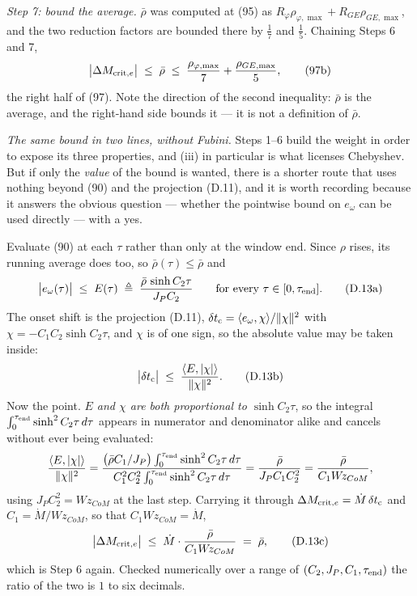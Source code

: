 \documentclass[11pt]{article}
\newcommand{\Wz}{W\!z_{CoM}}
\newcommand{\te}{\tau_{\rm end}}
\newcommand{\rbar}{\bar\rho}
\begin{document}
\emph{Step 7: bound the average.} $\rbar$ was computed at (95) as
$R_\varphi\rho_{\varphi,\max} + R_{GE}\rho_{GE,\max}$, and the two
reduction factors are bounded there by $\tfrac17$ and $\tfrac15$.
Chaining Steps 6 and 7,
\begin{equation}
  \bigl|\Delta M_{{\rm crit},e}\bigr| \;\le\; \rbar
  \;\le\; \frac{\rho_{\varphi,\max}}{7} + \frac{\rho_{GE,\max}}{5},
  \tag{97b}
\end{equation}
the right half of (97). Note the direction of the second inequality:
$\rbar$ is the average, and the right-hand side bounds it --- it is not
a definition of $\rbar$.

\emph{The same bound in two lines, without Fubini.} Steps 1--6 build the
weight in order to expose its three properties, and (iii) in particular
is what licenses Chebyshev. But if only the \emph{value} of the bound is
wanted, there is a shorter route that uses nothing beyond (90) and the
projection (D.11), and it is worth recording because it answers the
obvious question --- whether the pointwise bound on $e_\omega$ can be
used directly --- with a yes.

Evaluate (90) at each $\tau$ rather than only at the window end. Since
$\rho$ rises, its running average does too, so $\rbar(\tau)\le\rbar$ and
\begin{equation}
  \bigl|e_\omega(\tau)\bigr| \;\le\; E(\tau)
   \;\triangleq\; \frac{\rbar\,\sinh C_2\tau}{J_PC_2}
  \qquad\text{for every }\tau\in[0,\te].
  \tag{D.13a}
\end{equation}
The onset shift is the projection (D.11),
$\delta t_{\rm c} = \langle e_\omega,\chi\rangle/\|\chi\|^{2}$ with
$\chi = -C_1C_2\sinh C_2\tau$, and $\chi$ is of one sign, so the
absolute value may be taken inside:
\begin{equation}
  \bigl|\delta t_{\rm c}\bigr|
  \;\le\; \frac{\langle E,|\chi|\rangle}{\|\chi\|^{2}} .
  \tag{D.13b}
\end{equation}
Now the point. \emph{$E$ and $\chi$ are both proportional to
$\sinh C_2\tau$}, so the integral $\int_0^{\te}\sinh^2 C_2\tau\,d\tau$
appears in numerator and denominator alike and cancels without ever
being evaluated:
\[
  \frac{\langle E,|\chi|\rangle}{\|\chi\|^{2}}
  = \frac{\bigl(\rbar C_1/J_P\bigr)\int_0^{\te}\sinh^2 C_2\tau\,d\tau}
         {C_1^{2}C_2^{2}\int_0^{\te}\sinh^2 C_2\tau\,d\tau}
  = \frac{\rbar}{J_PC_1C_2^{2}}
  = \frac{\rbar}{C_1\Wz},
\]
using $J_PC_2^{2} = \Wz$ at the last step. Carrying it through
$\Delta M_{{\rm crit},e} = \dot M\,\delta t_{\rm c}$ and
$C_1 = \dot M/\Wz$, so that $C_1\Wz = \dot M$,
\begin{equation}
  \bigl|\Delta M_{{\rm crit},e}\bigr|
   \;\le\; \dot M\cdot\frac{\rbar}{C_1\Wz}
   \;=\; \rbar ,
  \tag{D.13c}
\end{equation}
which is Step 6 again. Checked numerically over a range of
$(C_2,J_P,C_1,\te)$ the ratio of the two is $1$ to six decimals.
\end{document}
